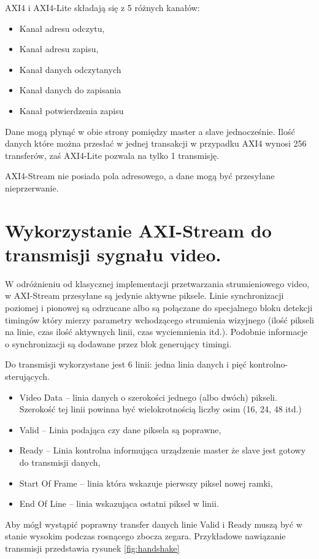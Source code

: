 AXI4 i AXI4-Lite składają się z 5 różnych kanałów:
\begin{itemize}
\item Kanał adresu odczytu,
\item Kanał adresu zapisu,
\item Kanał danych odczytanych
\item Kanał danych do zapisania
\item Kanał potwierdzenia zapisu
\end{itemize}
Dane mogą płynąć w obie strony pomiędzy master a slave jednocześnie. Ilość danych które można przesłać w jednej transakcji w przypadku AXI4 wynosi 256 transferów, zaś AXI4-Lite pozwala na tylko 1 transmisję.

AXI4-Stream nie posiada pola adresowego, a dane mogą być przesyłane nieprzerwanie. 
\section{Wykorzystanie AXI-Stream do transmisji sygnału video.} 
W odróżnieniu od klasycznej implementacji przetwarzania strumieniowego video, w AXI-Stream przesyłane są jedynie aktywne piksele. Linie synchronizacji poziomej i pionowej są odrzucane albo są połączane do specjalnego bloku detekcji timingów który mierzy parametry wchodzącego strumienia wizyjnego (ilość pikseli na linie, czas ilość aktywnych linii, czas wyciemnienia itd.). Podobnie informacje o synchronizacji są dodawane przez blok generujący timingi.

Do transmisji wykorzystane jest 6 linii: jedna linia danych i pięć kontrolno-sterujących. 
\begin{itemize}
\item Video Data – linia danych o szerokości jednego (albo dwóch) pikseli. Szerokość tej linii powinna być wielokrotnością liczby osim (16, 24, 48 itd.)
\item Valid – Linia podająca czy dane piksela są poprawne,
\item Ready – Linia kontrolna informująca urządzenie master że slave jest gotowy do transmisji danych,
\item Start Of Frame – linia która wskazuje pierwszy piksel nowej ramki,
\item End Of Line – linia wskazująca ostatni piksel w linii.
\end{itemize}
Aby mógł wystąpić poprawny transfer danych linie Valid i Ready muszą być w stanie wysokim podczas rosnącego zbocza zegara. Przykładowe nawiązanie transmisji przedstawia rysunek \ref{fig:handshake}

